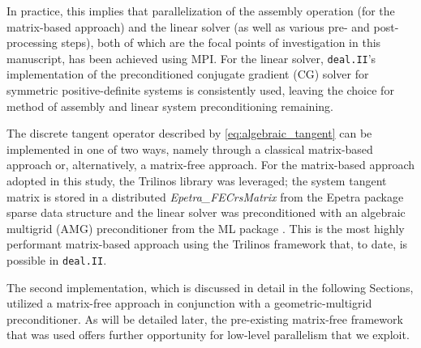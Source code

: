 \documentclass[times,doublespace]{nmeauth}
\begin{document}
In practice, this implies that parallelization of the assembly operation (for the matrix-based approach) and the linear solver (as well as various pre- and post-processing steps), both of which are the focal points of investigation in this manuscript, has been achieved using MPI.
For the linear solver, \texttt{deal.II}'s implementation of the preconditioned conjugate gradient (CG) solver for symmetric positive-definite systems is consistently used, leaving the choice for method of assembly and linear system preconditioning remaining.

The discrete tangent operator described by \eqref{eq:algebraic_tangent} can be implemented in one of two ways, namely through a classical matrix-based approach or, alternatively, a matrix-free approach.
For the matrix-based approach adopted in this study, the Trilinos \cite{Heroux2005} library was leveraged;
the system tangent matrix is stored in a distributed \textit{Epetra\_FECrsMatrix} from the Epetra package \cite{Heroux2005b} sparse data structure and the linear solver was preconditioned with an algebraic multigrid (AMG) preconditioner from the ML package \cite{Gee2006a}.
This is the most highly performant matrix-based approach using the Trilinos framework that, to date, is possible in  \texttt{deal.II}.

The second implementation, which is discussed in detail in the following Sections, utilized a matrix-free approach in conjunction with a geometric-multigrid preconditioner.
As will be detailed later, the pre-existing matrix-free framework that was used offers further opportunity for low-level parallelism that we exploit.
\end{document}
